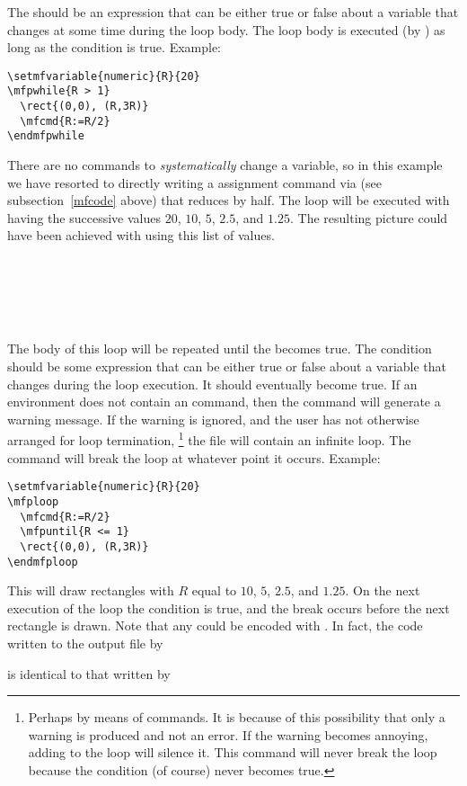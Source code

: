 \documentclass[letterpaper]{article}
\begin{document}
The  should be an expression that can be either true or
false about a \MF{} variable that changes at some time during the loop
body. The loop body is executed (by \MF) as long as the condition is
true. Example:
\begin{verbatim}
\setmfvariable{numeric}{R}{20}
\mfpwhile{R > 1}
  \rect{(0,0), (R,3R)}
  \mfcmd{R:=R/2}
\endmfpwhile
\end{verbatim}
There are no \mfp{} commands to \emph{systematically} change a variable,
so in this example we have resorted to directly writing a \MF{} assignment
command via  (see subsection~\ref{mfcode} above) that reduces
 by half. The loop will be executed with  having the
successive values $20$, $10$, $5$, $2.5$, and $1.25$. The resulting
picture could have been achieved with  using this list of
values.

\begin{cd}
\\
 \ \\
\\
 \ \\
%
%
%
%
\end{cd}

The body of this loop will be repeated until the 
becomes true. The condition should be some expression that can be either
true or false about a variable that changes during the loop execution.
It should eventually become true. If an  environment does
not contain an  command, then the  command
will generate a warning message. If the warning is ignored, and the user
has not otherwise arranged for loop termination,%
    \footnote{Perhaps by means of  commands. It is because of
    this possibility that only a warning is produced and not an error.
    If the warning becomes annoying, adding  to
    the loop will silence it. This command will never break the loop
    because the condition  (of course) never becomes true.}
the  file will contain an infinite loop. The 
command will break the loop at whatever point it occurs. Example:
\begin{verbatim}
\setmfvariable{numeric}{R}{20}
\mfploop
  \mfcmd{R:=R/2}
  \mfpuntil{R <= 1}
  \rect{(0,0), (R,3R)}
\endmfploop
\end{verbatim}
This will draw rectangles with $R$ equal to $10$, $5$, $2.5$, and
$1.25$. On the next execution of the loop the condition  is
true, and the break occurs before the next rectangle is drawn. Note that
any  could be encoded with . In fact, the code
written to the output file by
\begin{display}
\end{display}
is identical to that written by
\begin{display}
\end{display}
\end{document}
